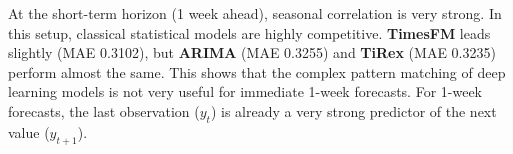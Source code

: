 \begin{table}[htbp]
\centering
\caption{Performance by Horizon (MAE / WIS)}
\label{tab:performance_by_horizon}
\setlength{\tabcolsep}{8pt}
\small
{}
\end{table}

At the short-term horizon (1 week ahead), seasonal correlation is very strong. In this setup, classical statistical models are highly competitive. \textbf{TimesFM} leads slightly (MAE 0.3102), but \textbf{ARIMA} (MAE 0.3255) and \textbf{TiRex} (MAE 0.3235) perform almost the same. This shows that the complex pattern matching of deep learning models is not very useful for immediate 1-week forecasts. For 1-week forecasts, the last observation ($y_t$) is already a very strong predictor of the next value ($y_{t+1}$).

